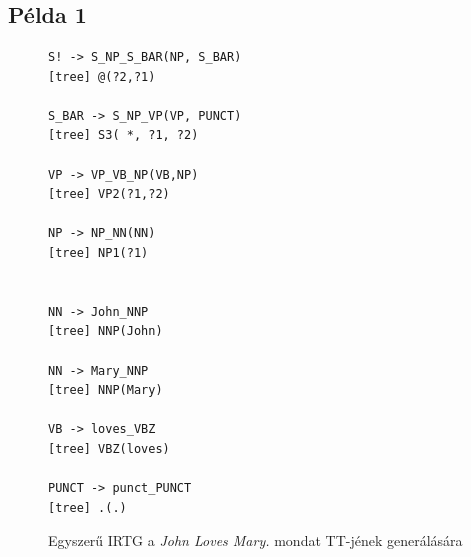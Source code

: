 \appendix
\chapter*{\fuggelek}
\setcounter{chapter}{\appendixnumber}



\section{Példa 1}
\label{sec:example1}

\begin{figure}[h]
\begin{verbatim}
S! -> S_NP_S_BAR(NP, S_BAR)
[tree] @(?2,?1)

S_BAR -> S_NP_VP(VP, PUNCT)
[tree] S3( *, ?1, ?2)

VP -> VP_VB_NP(VB,NP)
[tree] VP2(?1,?2)

NP -> NP_NN(NN)
[tree] NP1(?1)


NN -> John_NNP
[tree] NNP(John)

NN -> Mary_NNP
[tree] NNP(Mary)

VB -> loves_VBZ
[tree] VBZ(loves)

PUNCT -> punct_PUNCT
[tree] .(.)
\end{verbatim}
\caption{Egyszerű IRTG a \textit{John Loves Mary.} mondat TT-jének generálására}
\label{cod:example1}
\end{figure}

